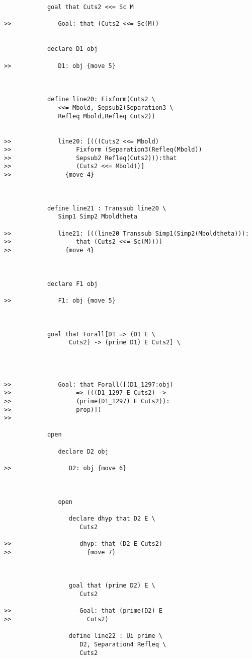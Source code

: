 \documentclass[12pt]{article}
\begin{document}
\begin{verbatim}
            goal that Cuts2 <<= Sc M

>>             Goal: that (Cuts2 <<= Sc(M))


            declare D1 obj

>>             D1: obj {move 5}



            define line20: Fixform(Cuts2 \
               <<= Mbold, Sepsub2(Separation3 \
               Refleq Mbold,Refleq Cuts2))


>>             line20: [(((Cuts2 <<= Mbold)
>>                  Fixform (Separation3(Refleq(Mbold))
>>                  Sepsub2 Refleq(Cuts2))):that
>>                  (Cuts2 <<= Mbold))]
>>               {move 4}



            define line21 : Transsub line20 \
               Simp1 Simp2 Mboldtheta

>>             line21: [((line20 Transsub Simp1(Simp2(Mboldtheta))):
>>                  that (Cuts2 <<= Sc(M)))]
>>               {move 4}



            declare F1 obj

>>             F1: obj {move 5}



            goal that Forall[D1 => (D1 E \
                  Cuts2) -> (prime D1) E Cuts2] \
               



>>             Goal: that Forall([(D1_1297:obj)
>>                  => (((D1_1297 E Cuts2) ->
>>                  (prime(D1_1297) E Cuts2)):
>>                  prop)])
>>               

            open

               declare D2 obj

>>                D2: obj {move 6}



               open

                  declare dhyp that D2 E \
                     Cuts2

>>                   dhyp: that (D2 E Cuts2)
>>                     {move 7}



                  goal that (prime D2) E \
                     Cuts2

>>                   Goal: that (prime(D2) E
>>                     Cuts2)

                  define line22 : Ui prime \
                     D2, Separation4 Refleq \
                     Cuts2


\end{verbatim}
\end{document}
